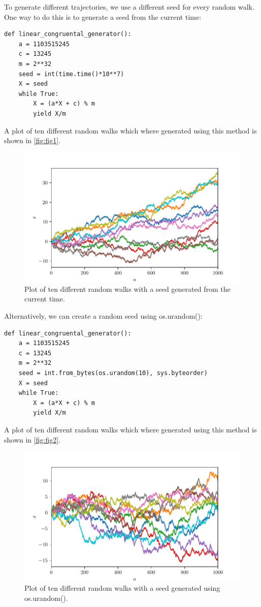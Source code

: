 \documentclass[a4paper,10pt,bibtotoc]{scrartcl}
\begin{document}
To generate different trajectories, we use a different seed for every random walk.
One way to do this is to generate a seed from the current time:
\begin{lstlisting}
def linear_congruental_generator():
    a = 1103515245
    c = 13245
    m = 2**32
    seed = int(time.time()*10**7)
    X = seed
    while True:
        X = (a*X + c) % m
        yield X/m
\end{lstlisting}
A plot of ten different random walks which where generated using this method is shown in \autoref{fig:fig1}.
\begin{figure}[H]
	\centering
	\includegraphics[width=\linewidth]{random_walk_time.pdf}
	\caption{Plot of ten different random walks with a seed generated from the current time.}
	\label{fig:fig1}
\end{figure}
\noindent Alternatively, we can create a random seed using os.urandom():
\begin{lstlisting}
def linear_congruental_generator():
    a = 1103515245
    c = 13245
    m = 2**32
    seed = int.from_bytes(os.urandom(10), sys.byteorder)
    X = seed
    while True:
        X = (a*X + c) % m
        yield X/m
\end{lstlisting}
A plot of ten different random walks which where generated using this method is shown in \autoref{fig:fig2}.
\begin{figure}[H]
	\centering
	\includegraphics[width=\linewidth]{random_walk_os.pdf}
	\caption{Plot of ten different random walks with a seed generated using os.urandom().}
	\label{fig:fig2}
\end{figure}
\end{document}

